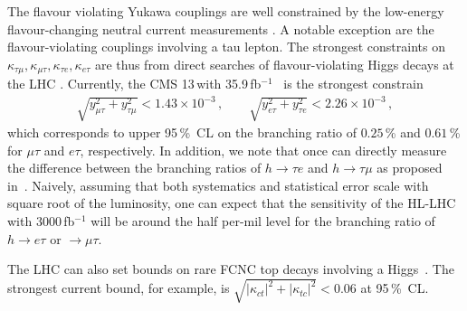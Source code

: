 \documentclass[../report.tex]{subfiles}
\begin{document}

The flavour violating Yukawa couplings are well constrained by the low-energy
flavour-changing neutral current measurements
\cite{Harnik:2012pb,Blankenburg:2012ex,Gorbahn:2014sha}. A notable
exception are the flavour-violating couplings involving a tau lepton. The
strongest constraints on $\kappa_{\tau\mu}, \kappa_{\mu\tau},
\kappa_{\tau e}, \kappa_{e \tau}$ are thus from direct searches of flavour-violating Higgs decays at
the LHC \cite{Sirunyan:2017xzt,Aad:2016blu}.
Currently, the CMS 13\,\UTeV with 35.9\,fb$^{-1}$~\cite{Sirunyan:2017xzt} is the strongest constrain 
%
\begin{align}
    \sqrt{y_{\mu\tau}^2 + y^2_{\tau\mu}} < 1.43 \times 10^{-3}\, , \qquad
    \sqrt{y_{e\tau}^2 + y^2_{\tau e}} < 2.26 \times 10^{-3}\, ,
\end{align}
%
which corresponds to upper 95\,\%~CL on the branching ratio of $0.25\,$\% and $0.61\,$\% for $\mu\tau$ and $e\tau$, respectively. In addition, we note that once can directly measure the difference between the branching ratios of $h\to\tau e$ and $h\to\tau\mu$ as proposed in~\cite{Bressler:2014jta}.
Naively, assuming that both systematics and statistical error scale with square root of the luminosity, one can expect that the sensitivity of the HL-LHC with $3000\,$fb$^{-1}$ will be  around the half per-mil level for the branching ratio of $h\to e\tau$ or $\to \mu\tau$. 


The LHC can also set bounds on rare FCNC top decays involving a Higgs~\cite{Aaboud:2017mfd,Khachatryan:2016atv,Aad:2015pja,Aad:2014dya}. The strongest current bound, for example, is $\sqrt{|\kappa_{ct}|^2+|\kappa_{tc}|^2}<0.06$ at 95\,\%~CL.

\label{sec:HiggsDist}

\end{document}
